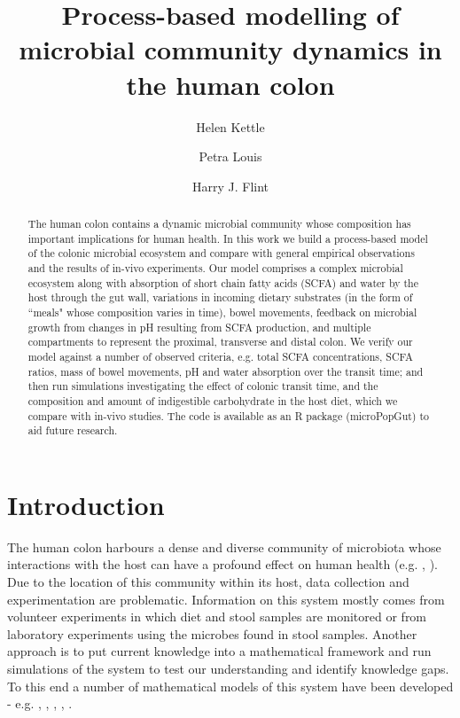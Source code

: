 \documentclass[a4paper]{article}
\title{Process-based modelling of microbial community dynamics in the human colon}
\author[1,*]{Helen Kettle}
\author[2]{Petra Louis}
\author[2]{Harry J. Flint}
\affil[1]{Biomathematics and Statistics Scotland, James Clerk Maxwell Building, Peter Guthrie Tait Road, Edinburgh, EH9 3FD}
\affil[2]{Gut Health Group, Rowett Institute, University of Aberdeen, Aberdeen, UK}
\affil[*]{Corresponding author: Helen.Kettle@bioss.ac.uk}
\begin{document}
\maketitle

\linenumbers


\begin{abstract}
The human colon contains a dynamic microbial community whose composition has important implications for human health. In this work we build a process-based model of the colonic microbial ecosystem and compare with general empirical observations and the results of in-vivo experiments.   
Our model comprises a complex microbial ecosystem along with absorption of short chain fatty acids (SCFA) and water by the host through the gut wall, variations in incoming dietary substrates (in the form of ``meals" whose composition varies in time), bowel movements, feedback on microbial growth from changes in pH resulting from SCFA production, and multiple compartments to represent the proximal, transverse and distal colon. 
We verify our model against a number of observed criteria, e.g. total SCFA concentrations, SCFA ratios, mass of bowel movements, pH and water absorption over the transit time; and then run simulations investigating the effect of colonic transit time, and the composition and amount of indigestible carbohydrate in the host diet, which we compare with in-vivo studies.
The code is available as an R package (microPopGut) to aid future research.
\end{abstract}


\section*{Introduction}
The human colon harbours a dense and diverse community of microbiota whose interactions with the host can have a profound effect on human health (e.g. \cite{health1}, \cite{morrison2016}). Due to the location of this community within its host, data collection and experimentation are problematic. Information on this system mostly comes from volunteer experiments in which diet and stool samples are monitored or from laboratory experiments using the microbes found in stool samples. Another approach is to put current knowledge into a mathematical framework and run simulations of the system to test our understanding and identify knowledge gaps. To this end a number of mathematical models of this system have been developed - e.g. 
\cite{Cremer16}, \cite{Cremer17}, \cite{Munoz}, \cite{smith}, \cite{moorthy}.
\end{document}
